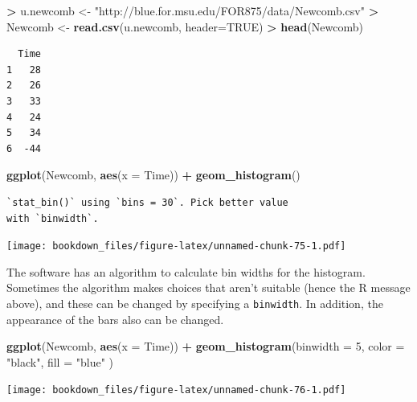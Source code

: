 \documentclass[]{krantz}
\makeatletter
\newenvironment{Shaded}{\begin{snugshade}}{\end{snugshade}}
\newcommand{\KeywordTok}[1]{\textcolor[rgb]{0.27,0.27,0.27}{\textbf{#1}}}
\newcommand{\DataTypeTok}[1]{\textcolor[rgb]{0.27,0.27,0.27}{#1}}
\newcommand{\DecValTok}[1]{\textcolor[rgb]{0.06,0.06,0.06}{#1}}
\newcommand{\StringTok}[1]{\textcolor[rgb]{0.5,0.5,0.5}{#1}}
\newcommand{\OtherTok}[1]{\textcolor[rgb]{0.37,0.37,0.37}{#1}}
\newcommand{\OperatorTok}[1]{\textcolor[rgb]{0.43,0.43,0.43}{\textbf{#1}}}
\newcommand{\NormalTok}[1]{#1}
\newenvironment{kframe}{%
\medskip{}
\setlength{\fboxsep}{.8em}
 \def\at@end@of@kframe{}%
 \ifinner\ifhmode%
  \def\at@end@of@kframe{\end{minipage}}%
  \begin{minipage}{\columnwidth}%
 \fi\fi%
 \def\FrameCommand##1{\hskip\@totalleftmargin \hskip-\fboxsep
 \colorbox{shadecolor}{##1}\hskip-\fboxsep
     \hskip-\linewidth \hskip-\@totalleftmargin \hskip\columnwidth}%
 \MakeFramed {\advance\hsize-\width
   \@totalleftmargin\z@ \linewidth\hsize
   \@setminipage}}%
 {\par\unskip\endMakeFramed%
 \at@end@of@kframe}
\renewenvironment{Shaded}{\begin{kframe}}{\end{kframe}}
\makeatother
\begin{document}
\begin{Shaded}
\begin{Highlighting}[]
\OperatorTok{>}\StringTok{ }\NormalTok{u.newcomb <-}\StringTok{ "http://blue.for.msu.edu/FOR875/data/Newcomb.csv"}
\OperatorTok{>}\StringTok{ }\NormalTok{Newcomb <-}\StringTok{ }\KeywordTok{read.csv}\NormalTok{(u.newcomb, }\DataTypeTok{header=}\OtherTok{TRUE}\NormalTok{)}
\OperatorTok{>}\StringTok{ }\KeywordTok{head}\NormalTok{(Newcomb)}
\end{Highlighting}
\end{Shaded}

\begin{verbatim}
  Time
1   28
2   26
3   33
4   24
5   34
6  -44
\end{verbatim}

\begin{Shaded}
\begin{Highlighting}[]
\KeywordTok{ggplot}\NormalTok{(Newcomb, }\KeywordTok{aes}\NormalTok{(}\DataTypeTok{x =}\NormalTok{ Time)) }\OperatorTok{+}\StringTok{ }\KeywordTok{geom_histogram}\NormalTok{()}
\end{Highlighting}
\end{Shaded}

\begin{verbatim}
`stat_bin()` using `bins = 30`. Pick better value
with `binwidth`.
\end{verbatim}

\texttt{[image: bookdown\_files/figure-latex/unnamed-chunk-75-1.pdf]}

The software has an algorithm to calculate bin widths for the histogram.
Sometimes the algorithm makes choices that aren't suitable (hence the R
message above), and these can be changed by specifying a
\texttt{binwidth}. In addition, the appearance of the bars also can be
changed.

\begin{Shaded}
\begin{Highlighting}[]
\KeywordTok{ggplot}\NormalTok{(Newcomb, }\KeywordTok{aes}\NormalTok{(}\DataTypeTok{x =}\NormalTok{ Time)) }\OperatorTok{+}\StringTok{ }
\StringTok{    }\KeywordTok{geom_histogram}\NormalTok{(}\DataTypeTok{binwidth =} \DecValTok{5}\NormalTok{, }\DataTypeTok{color =} \StringTok{"black"}\NormalTok{, }\DataTypeTok{fill =} \StringTok{"blue"}\NormalTok{ )}
\end{Highlighting}
\end{Shaded}

\texttt{[image: bookdown\_files/figure-latex/unnamed-chunk-76-1.pdf]}
\end{document}
